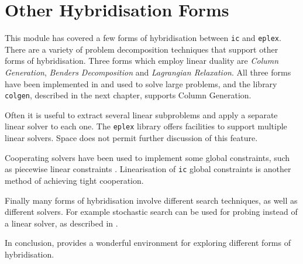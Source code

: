 
\section{Other Hybridisation Forms}
This module has covered a few forms of hybridisation between {\tt ic}
and {\tt eplex}.
There are a variety of problem decomposition techniques that support
other forms of hybridisation.  Three forms which employ linear duality
are {\em Column Generation}, {\em Benders Decomposition} and {\em
Lagrangian Relaxation}. 
All three forms have been implemented in \eclipse{} and used to solve
large problems, and the \eclipse{} library {\tt colgen}, described in
the next chapter, supports Column Generation.

Often it is useful to extract several linear subproblems and apply a
separate linear solver to each one.  The {\tt eplex} library offers
facilities to support multiple linear solvers.  Space does not permit
further discussion of this feature.

Cooperating solvers have been used to implement some global
constraints, such as piecewise linear constraints \cite{Refalo99}.
Linearisation of {\tt ic} global constraints
is another method of achieving tight cooperation.

Finally many forms of hybridisation involve different search
techniques, as well as different solvers.  For example stochastic
search can be used for probing instead of a linear solver, as described
in \cite{cp99wkshoptalk}.
  
In conclusion, \eclipse{} provides a wonderful environment for exploring
different 
forms of hybridisation.

